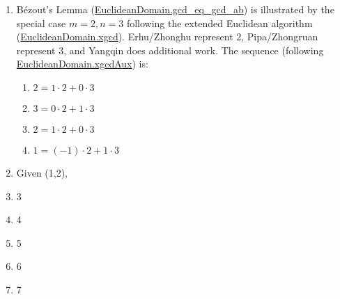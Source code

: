 \documentclass[12pt]{article}
\begin{document}
\begin{enumerate}

\item Bézout’s Lemma
  (\href{https://leanprover-community.github.io/mathlib4_docs/Mathlib/Algebra/EuclideanDomain/Basic.html#EuclideanDomain.gcd_eq_gcd_ab}{EuclideanDomain.gcd\_eq\_gcd\_ab})
  is illustrated by the special case $m = 2, n = 3$ following
  the extended Euclidean algorithm
  (\href{https://leanprover-community.github.io/mathlib4_docs/Mathlib/Algebra/EuclideanDomain/Defs.html#EuclideanDomain.xgcd}{EuclideanDomain.xgcd}).
Erhu/Zhonghu represent
2, Pipa/Zhongruan represent 3, and Yangqin does additional work. The
sequence (following
\href{https://leanprover-community.github.io/mathlib4_docs/Mathlib/Algebra/EuclideanDomain/Defs.html#EuclideanDomain.xgcdAux}{EuclideanDomain.xgcdAux}) is:

\begin{enumerate}
\item $2 = 1\cdot 2 + 0\cdot 3$
\item $3 = 0\cdot 2 + 1\cdot 3$
\item $2 = 1\cdot 2 + 0\cdot 3$
\item $1 = (-1)\cdot 2 + 1\cdot 3$
\end{enumerate}

\item Given (1,2), 

\item 3
\item 4
\item 5
\item 6
\item 7

\end{enumerate}
\end{document}
